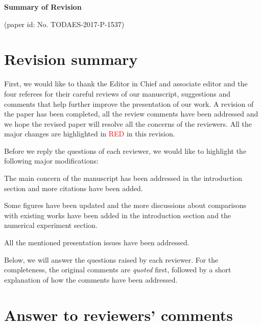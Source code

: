 \newpage
\onecolumn

\setcounter{page}{1} \vskip 2pc

\centerline{\LARGE \bf Summary of Revision}
\centerline{\Large (paper id: No.
TODAES-2017-P-1537)}

\section{Revision summary}

First, we would like to thank the Editor in Chief and associate editor
and the four referees for their careful reviews of our manuscript,
suggestions and comments that help further improve the presentation of
our work.  A revision of the paper has been completed, all the review
comments have been addressed and we hope the revised paper will
resolve all the concerns of the reviewers.  All the major changes are
highlighted in \textcolor{red}{RED} in this revision.

Before we reply the questions of each reviewer, we would like to
highlight the following major modifications:

\begin{itemlist}

\item The main concern of the manuscript has been addressed in the
introduction section and more citations have been added.

\item Some figures have been updated and the more
discussions about comparisons with existing works have been added in
the introduction section and the numerical experiment section.

\item All the mentioned presentation issues have been addressed.

\end{itemlist}

Below, we will answer the questions raised by each reviewer. For the
completeness, the original comments are {\it quoted} first, followed
by a short explanation of how the comments have been addressed.


\vspace{0.2in}


\section{Answer to reviewers' comments}


